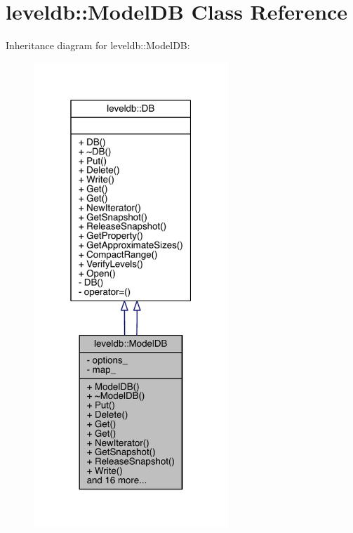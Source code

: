 \hypertarget{classleveldb_1_1_model_d_b}{}\section{leveldb\+:\+:Model\+D\+B Class Reference}
\label{classleveldb_1_1_model_d_b}


Inheritance diagram for leveldb\+:\+:Model\+D\+B\+:\nopagebreak
\begin{figure}[H]
\begin{center}
\leavevmode
\includegraphics[width=208pt]{classleveldb_1_1_model_d_b__inherit__graph}
\end{center}
\end{figure}


